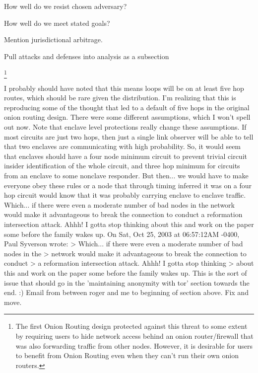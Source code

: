 \documentclass[times,10pt,twocolumn]{article}
\begin{document}
How well do we resist chosen adversary?

How well do we meet stated goals?

Mention jurisdictional arbitrage.

Pull attacks and defenses into analysis as a subsection

\label{sec:maintaining-anonymity}

\footnote{The first Onion Routing design \cite{or-ih96} protected against
this threat to some
extent by requiring users to hide network access behind an onion
router/firewall that was also forwarding traffic from other nodes.
However, it is desirable for users to
benefit from Onion Routing even when they can't run their own
onion routers.
}

I probably should have noted that this means loops will be on at least
five hop routes, which should be rare given the distribution.  I'm    
realizing that this is reproducing some of the thought that led to a  
default of five hops in the original onion routing design.  There were
some different assumptions, which I won't spell out now.  Note that   
enclave level protections really change these assumptions.  If most   
circuits are just two hops, then just a single link observer will be  
able to tell that two enclaves are communicating with high probability.
So, it would seem that enclaves should have a four node minimum circuit
to prevent trivial circuit insider identification of the whole circuit,
and three hop minimum for circuits from an enclave to some nonclave    
responder. But then... we would have to make everyone obey these rules 
or a node that through timing inferred it was on a four hop circuit    
would know that it was probably carrying enclave to enclave traffic.   
Which... if there were even a moderate number of bad nodes in the      
network would make it advantageous to break the connection to conduct  
a reformation intersection attack. Ahhh! I gotta stop thinking         
about this and work on the paper some before the family wakes up.  
On Sat, Oct 25, 2003 at 06:57:12AM -0400, Paul Syverson wrote:
> Which... if there were even a moderate number of bad nodes in the
> network would make it advantageous to break the connection to conduct
> a reformation intersection attack. Ahhh! I gotta stop thinking
> about this and work on the paper some before the family wakes up. 
This is the sort of issue that should go in the 'maintaining anonymity
with tor' section towards the end. :)
Email from between roger and me to beginning of section above. Fix and move.
\end{document}
